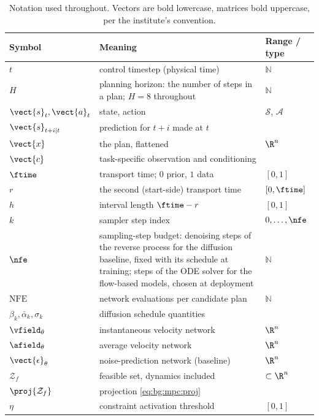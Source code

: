 \begin{table}[htpb]
  \caption[Notation]{Notation used throughout. Vectors are bold lowercase, matrices bold
  uppercase, per the institute's convention.}
  \centering
  \label{tab:notation}
  \begin{tabularx}{\linewidth}{lLl}
    \toprule
    Symbol & Meaning & Range / type \\
    \midrule
    $t$ & control timestep (physical time) & $\mathbb{N}$ \\
    $H$ & planning horizon: the number of steps in a plan; $H=8$ throughout & $\mathbb{N}$ \\
    $\vect{s}_{t},\vect{a}_{t}$ & state, action & $\mathcal{S}$, $\mathcal{A}$ \\
    $\vect{s}_{t+i|t}$ & prediction for $t+i$ made at $t$ & \\
    $\vect{x}$ & the plan, flattened & $\R^{n}$ \\
    $\vect{c}$ & task-specific observation and conditioning & \\
    $\ftime$ & transport time; $0$ prior, $1$ data & $[0,1]$ \\
    $r$ & the second (start-side) transport time & $[0,\ftime]$ \\
    $h$ & interval length $\ftime-r$ & $[0,1]$ \\
    $k$ & sampler step index & $0,\dots,\nfe$ \\
    $\nfe$ & sampling-step budget: denoising steps of the reverse process
      for the diffusion baseline, fixed with its schedule at training; steps of the \ac{ODE} solver
      for the flow-based models, chosen at deployment & $\mathbb{N}$ \\
    $\mathrm{NFE}$ & network evaluations per candidate plan & $\mathbb{N}$ \\
    $\beta_{k},\bar{\alpha}_{k},\sigma_{k}$ & diffusion schedule quantities & \\
    $\vfield_{\theta}$ & instantaneous velocity network & $\R^{n}$ \\
    $\afield_{\theta}$ & average velocity network & $\R^{n}$ \\
    $\vect{\epsilon}_{\theta}$ & noise-prediction network (baseline) & $\R^{n}$ \\
    $\mathcal{Z}_{f}$ & feasible set, dynamics included & $\subset\R^{n}$ \\
    $\proj{\mathcal{Z}_{f}}$ & projection \eqref{eq:bg:mpc:proj} & \\
    $\eta$ & constraint activation threshold & $[0,1]$ \\

\end{tabularx}
\end{table}
